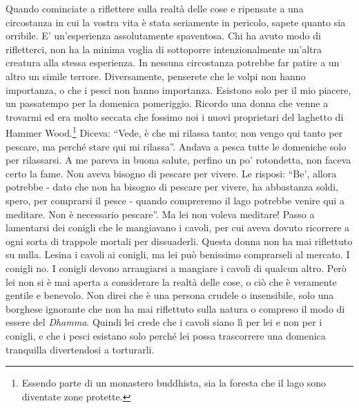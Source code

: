 Quando cominciate a riflettere sulla realtà delle cose e ripensate a una
circostanza in cui la vostra vita è stata seriamente in pericolo, sapete
quanto sia orribile. E' un'esperienza assolutamente spaventosa. Chi ha
avuto modo di rifletterci, non ha la minima voglia di sottoporre
intenzionalmente un'altra creatura alla stessa esperienza. In nessuna
circostanza potrebbe far patire a un altro un simile terrore.
Diversamente, penserete che le volpi non hanno importanza, o che i pesci
non hanno importanza. Esistono solo per il mio piacere, un passatempo
per la domenica pomeriggio. Ricordo una donna che venne a trovarmi ed
era molto seccata che fossimo noi i nuovi proprietari del laghetto di
Hammer Wood.\footnote{Essendo parte di un monastero buddhista, sia la foresta
che il lago sono diventate zone protette.} Diceva: ``Vede, è che mi rilassa tanto; non
vengo qui tanto per pescare, ma perché stare qui mi rilassa''. Andava a
pesca tutte le domeniche solo per rilassarsi. A me pareva in buona
salute, perfino un po' rotondetta, non faceva certo la fame. Non aveva
bisogno di pescare per vivere. Le risposi: ``Be', allora potrebbe - dato
che non ha bisogno di pescare per vivere, ha abbastanza soldi, spero,
per comprarsi il pesce - quando compreremo il lago potrebbe venire qui a
meditare. Non è necessario pescare''. Ma lei non voleva meditare! Passo a
lamentarsi dei conigli che le mangiavano i cavoli, per cui aveva dovuto
ricorrere a ogni sorta di trappole mortali per dissuaderli. Questa donna
non ha mai riflettuto su nulla. Lesina i cavoli ai conigli, ma lei può
benissimo comprarseli al mercato. I conigli no. I conigli devono
arrangiarsi a mangiare i cavoli di qualcun altro. Però lei non si è mai
aperta a considerare la realtà delle cose, o ciò che è veramente gentile
e benevolo. Non direi che è una persona crudele o insensibile, solo una
borghese ignorante che non ha mai riflettuto sulla natura o compreso il
modo di essere del \textit{Dhamma}. Quindi lei crede che i cavoli siano lì per
lei e non per i conigli, e che i pesci esistano solo perché lei possa
trascorrere una domenica tranquilla divertendosi a torturarli.

